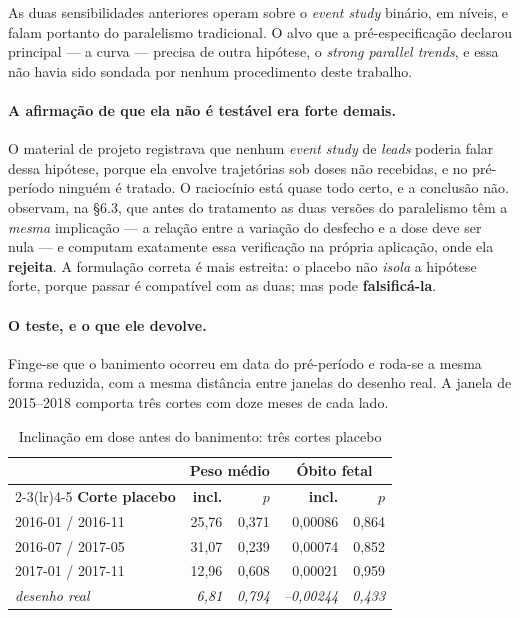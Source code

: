 As duas sensibilidades anteriores operam sobre o \emph{event study} binário, em
níveis, e falam portanto do paralelismo tradicional. O alvo que a
pré-especificação declarou principal --- a curva --- precisa de outra hipótese, o
\emph{strong parallel trends}, e essa não havia sido sondada por nenhum
procedimento deste trabalho.

\paragraph{A afirmação de que ela não é testável era forte demais.}
O material de projeto registrava que nenhum \emph{event study} de \emph{leads}
poderia falar dessa hipótese, porque ela envolve trajetórias sob doses não
recebidas, e no pré-período ninguém é tratado. O raciocínio está quase todo
certo, e a conclusão não. \citet{callaway2024continuous} observam, na §6.3, que
antes do tratamento as duas versões do paralelismo têm a \emph{mesma}
implicação --- a relação entre a variação do desfecho e a dose deve ser nula ---
e computam exatamente essa verificação na própria aplicação, onde ela
\textbf{rejeita}. A formulação correta é mais estreita: o placebo não
\emph{isola} a hipótese forte, porque passar é compatível com as duas; mas pode
\textbf{falsificá-la}.

\paragraph{O teste, e o que ele devolve.}
Finge-se que o banimento ocorreu em data do pré-período e roda-se a mesma forma
reduzida, com a mesma distância entre janelas do desenho real. A janela de
2015--2018 comporta três cortes com doze meses de cada lado.

\begin{table}[htbp]
\centering
\caption{Inclinação em dose antes do banimento: três cortes placebo}
\label{tab:spt}
\small
\begin{tabular}{lrrrr}
\toprule
& \multicolumn{2}{c}{\textbf{Peso médio}} & \multicolumn{2}{c}{\textbf{Óbito fetal}} \\
\cmidrule(lr){2-3}\cmidrule(lr){4-5}
\textbf{Corte placebo} & \textbf{incl.} & \textbf{\(p\)} & \textbf{incl.} & \textbf{\(p\)} \\
\midrule
2016-01 / 2016-11 & 25,76 & 0,371 & 0,00086 & 0,864 \\
2016-07 / 2017-05 & 31,07 & 0,239 & 0,00074 & 0,852 \\
2017-01 / 2017-11 & 12,96 & 0,608 & 0,00021 & 0,959 \\
\midrule
\emph{desenho real} & \emph{6,81} & \emph{0,794} & \emph{--0,00244} & \emph{0,433} \\
\bottomrule
\end{tabular}
\end{table}

